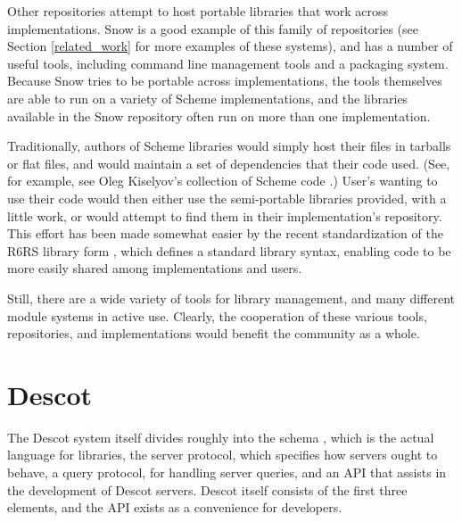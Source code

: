 \documentclass[9pt,cm,twocolumn,preprint]{sigplanconf}
\begin{document}
Other repositories attempt to host portable libraries 
that work across implementations. 
Snow \cite{snow} is a good example of this family of repositories 
(see Section \ref{related_work} for more examples of these systems), 
and has a number of useful tools, including command line 
management tools and a packaging system. 
Because Snow tries to be portable across implementations, the 
tools themselves are able to run on a variety of Scheme 
implementations, and the libraries available in the Snow repository 
often run on more than one implementation. 

Traditionally, authors of Scheme libraries would simply host their 
files in tarballs or flat files, and would maintain a set of 
dependencies that their code used. 
(See, for example, see Oleg Kiselyov's collection of Scheme code 
\cite{oleg_site}.)
User's wanting to use their code would then either use the 
semi-portable libraries provided, with a little work, or 
would attempt to find them in their implementation's repository. 
This effort has been made somewhat easier by the recent 
standardization of the R6RS library form \cite{r6rs}, 
which defines a standard library syntax, enabling code to be 
more easily shared among implementations and users. 

Still, there are a wide variety of tools for library management, 
and many different module systems in active use. 
Clearly, the cooperation of these various tools, repositories, 
and implementations would benefit the community as a whole. 

\section{Descot}
\label{descot_spec}
The Descot system itself divides roughly into the schema \cite{descotschema}, 
which is the actual language for libraries, 
the server protocol, which specifies how servers ought to behave, 
a query protocol, for handling server queries,
and an API that assists in the development of Descot servers.
Descot itself consists of the first three elements, 
and the API exists as a convenience for developers.

\end{document}
